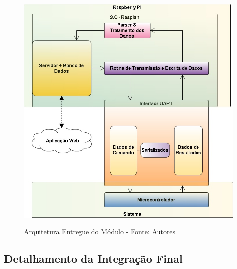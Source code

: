 \begin{figure}[H]
  \centering
  \includegraphics[keepaspectratio=true,scale=0.7]{figuras/nova_arquitetura.png}
  \label{fig:nova_arquitetura}
  \caption{Arquitetura Entregue do Módulo - Fonte: Autores}
\end{figure}


\subsection{Detalhamento da Integração Final}




